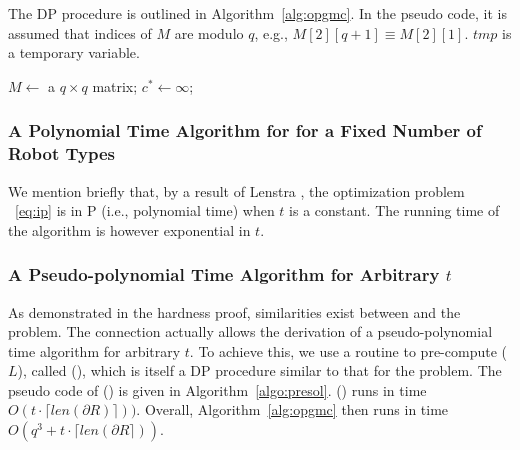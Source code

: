 The DP procedure is outlined in Algorithm~\ref{alg:opgmc}. In the pseudo code, 
it is assumed that indices of $M$ are modulo $q$, e.g., $M[2][q+1] 
\equiv M[2][1]$. $tmp$ is a temporary variable. 
\begin{comment}
\jy{Generally mathematicians and theoretical computer scientists use 
	$\ell_1, \ldots, \ell_t$ instead of $\ell_1, \ell_2, \ldots, \ell_t$. The later is more 
	redundant. Also, normally we use ldots instead of cdots. I changed $C$ to $M$ since 
    $C$ is used elsewhere. I changed $==$ to $=$ to save space.}
\end{comment}
\begin{algorithm}
    \DontPrintSemicolon
    $M \leftarrow$ a $q\times q$ matrix; $c^* \leftarrow \infty$; \;
    \caption{\opgmcdp}
    \label{alg:opgmc}
\end{algorithm}

\subsubsection{A Polynomial Time Algorithm for \opgmc for a Fixed Number of Robot Types}
We mention briefly that, by a result of Lenstra \cite{len83}, the optimization problem 
~\eqref{eq:ip} is in P (i.e., polynomial time) when $t$ is a constant. The running time of 
the algorithm \cite{len83} is however exponential in $t$. 

\subsubsection{A Pseudo-polynomial Time Algorithm for Arbitrary $t$}
As demonstrated in the hardness proof, similarities exist between \opg and the \knapsack 
problem. The connection actually allows the derivation of a pseudo-polynomial time algorithm
for arbitrary $t$. To achieve this, we use a routine to pre-compute \sol($L$), called 
\presol(), which is itself a DP procedure similar to that for the \knapsack problem. The 
pseudo code of \presol() is given in Algorithm~\ref{algo:presol}.
\presol() runs in time $O(t\cdot\lceil len(\partial R)\rceil))$. Overall, 
Algorithm~\ref{alg:opgmc} then runs in time $O(q^3+t\cdot\lceil len(\partial R\rceil))$.

